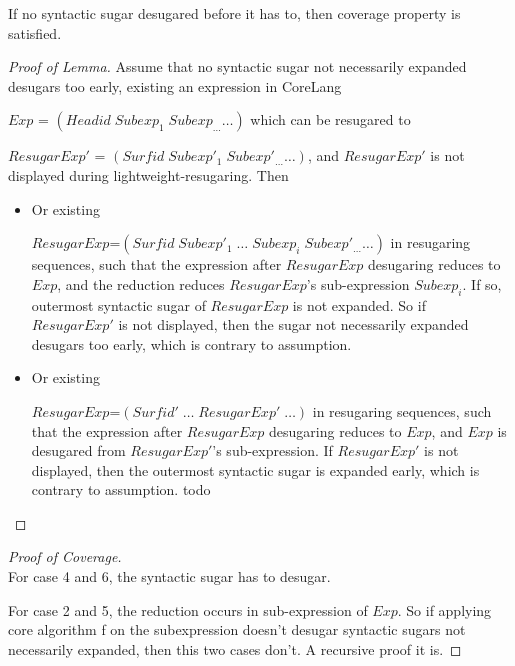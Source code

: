 \begin{lemma}
If no syntactic sugar desugared before it has to, then coverage property is satisfied.
\end{lemma}

\begin{proof}[Proof of Lemma]
Assume that no syntactic sugar not necessarily expanded desugars too early, existing an expression in CoreLang

$Exp$ = $(Headid\;Subexp_{1}\;Subexp_{\ldots} \ldots)$ which can be resugared to

$ResugarExp'$ = $(Surfid\;Subexp'_{1}\;Subexp'_{\ldots}\ldots)$, and $ResugarExp'$ is not displayed during lightweight-resugaring. Then

\begin{itemize}
	\item Or existing

	$ResugarExp$=$(Surfid\;Subexp'_{1}\;\ldots\;Subexp_{i}\;Subexp'_{\ldots}\ldots)$ in resugaring sequences, such that the expression after $ResugarExp$ desugaring reduces to $Exp$, and the reduction reduces $ResugarExp$'s sub-expression $Subexp_{i}$. If so, outermost syntactic sugar of $ResugarExp$ is not expanded. So if $ResugarExp'$ is not displayed, then the sugar not necessarily expanded desugars too early, which is contrary to assumption.


	\item Or existing

	$ResugarExp$=$(Surfid'\;\ldots\;ResugarExp'\;\ldots)$ in resugaring sequences, such that the expression after $ResugarExp$ desugaring reduces to $Exp$, and $Exp$ is desugared from $ResugarExp'$'s sub-expression. If $ResugarExp'$ is not displayed, then the outermost syntactic sugar is expanded early, which is contrary to assumption.
	todo

\end{itemize}
\end{proof}

\begin{proof}[Proof of Coverage]
\hfill\\
For case 4 and 6, the syntactic sugar has to desugar.

For case 2 and 5, the reduction occurs in sub-expression of $Exp$. So if applying core algorithm f on the subexpression doesn't desugar syntactic sugars not necessarily expanded, then this two cases don't. A recursive proof it is.
\end{proof}


